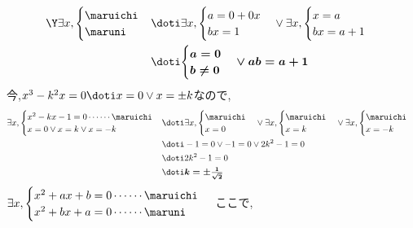 \documentclass[10pt,fleqn,a4paper]{jsarticle}
\newcommand{\ans}[1]{\mbox{\boldmath{$#1$}}}
\begin{document}
\begin{align*}
\Y\exists x,\begin{cases}
  \maruichi\\
  \maruni
\end{cases}&\doti\exists x,\begin{cases}
  a=0+0x\\
  bx=1
\end{cases}\vee\exists x,\begin{cases}
  x=a\\
  bx=a+1
\end{cases}\\
&\doti\ans{\begin{cases}a=0\\
  b\neq0
\end{cases}\vee ab=a+1}
\end{align*}
\newpage
\noindent\kakkoshib 今,$x^3-k^2x=0\doti x=0\vee x=\pm k$なので,
\begin{align*}
  \exists x,\begin{cases}
    x^2-kx-1=0\cdots\cdots\maruichi\\
    x=0\vee x=k\vee x=-k
  \end{cases}&\doti
    \exists x,\begin{cases}
      \maruichi\\
      x=0
    \end{cases}\vee\exists x,\begin{cases}
      \maruichi\\
      x=k
    \end{cases}\vee\exists x,\begin{cases}
      \maruichi\\
      x=-k
    \end{cases}\\
    &\doti-1=0\vee-1=0\vee2k^2-1=0\\
    &\doti2k^2-1=0\\
    &\doti\ans{k=\pm\frac{1}{\sqrt{2}}}
\end{align*}
\kakkogob$\exists x,\begin{cases}
  x^2+ax+b=0\cdots\cdots\maruichi\\
  x^2+bx+a=0\cdots\cdots\maruni
\end{cases}$
ここで,
\end{document}
